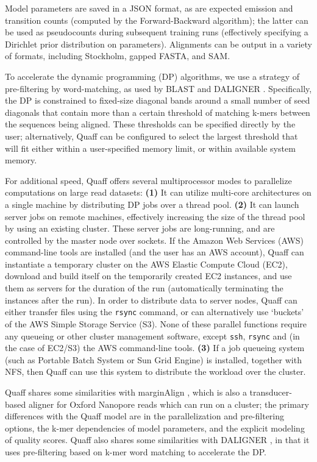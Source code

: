 \documentclass{bioinfo}
\begin{document}
\begin{methods}
Model parameters are saved in a JSON format, as are expected emission and transition counts (computed by the Forward-Backward algorithm); the latter can be used as pseudocounts during subsequent training runs (effectively specifying a Dirichlet prior distribution on parameters). Alignments can be output in a variety of formats, including Stockholm, gapped FASTA, and SAM.

To accelerate the dynamic programming (DP) algorithms, we use a strategy of pre-filtering by word-matching, as used by BLAST \citep{Altschul1990-bc} and DALIGNER \citep{Myers2014-em}. Specifically, the DP is constrained to fixed-size diagonal bands around a small number of seed diagonals that contain more than a certain threshold of matching k-mers between the sequences being aligned. These thresholds can be specified directly by the user; alternatively, Quaff can be configured to select the largest threshold that will fit either within a user-specified memory limit, or within available system memory.

For additional speed, Quaff offers several multiprocessor modes to parallelize computations on large read datasets: {\bf (1)} It can utilize multi-core architectures on a single machine by distributing DP jobs over a thread pool. {\bf (2)} It can launch server jobs on remote machines, effectively increasing the size of the thread pool by using an existing cluster. These server jobs are long-running, and are controlled by the master node over sockets. If the Amazon Web Services (AWS) command-line tools are installed (and the user has an AWS account), Quaff can instantiate a temporary cluster on the AWS Elastic Compute Cloud (EC2), download and build itself on the temporarily created EC2 instances, and use them as servers for the duration of the run (automatically terminating the instances after the run). In order to distribute data to server nodes, Quaff can either transfer files using the {\tt rsync} command, or can alternatively use `buckets' of the AWS Simple Storage Service (S3). None of these parallel functions require any queueing or other cluster management software, except {\tt ssh}, {\tt rsync} and (in the case of EC2/S3) the AWS command-line tools. {\bf (3)} If a job queueing system (such as Portable Batch System or Sun Grid Engine) is installed, together with NFS, then Quaff can use this system to distribute the workload over the cluster.

Quaff shares some similarities with marginAlign \citep{Jain2015-by}, which is also a transducer-based aligner for Oxford Nanopore reads which can run on a cluster; the primary differences with the Quaff model are in the parallelization and pre-filtering options, the k-mer dependencies of model parameters, and the explicit modeling of quality scores. Quaff also shares some similarities with DALIGNER \citep{Myers2014-em}, in that it uses pre-filtering based on k-mer word matching to accelerate the DP.



\end{methods}
\end{document}
